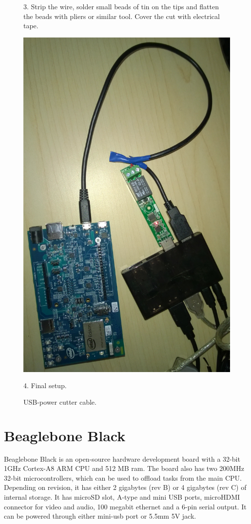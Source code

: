 \documentclass[a4paper,11pt]{article}
\begin{document}
\begin{figure}
\begin{minipage}[c][0.5\textheight][t]{0.49\textwidth}
	3. Strip the wire, solder small beads of tin on the tips and    flatten the beads with pliers or similar tool.
	Cover the cut with electrical tape.
	\end{minipage}
	\begin{minipage}[c][0.5\textheight][t]{0.49\textwidth}
	\centering
	\includegraphics[height=0.35\textheight]{edisonwire4.jpg}
	
	4. Final setup.
	\end{minipage}
	\caption{USB-power cutter cable.}
	\label{fig:usbpower}
\end{figure}

\newpage
\section{Beaglebone Black}
Beaglebone Black is an open-source hardware development board with a 32-bit 1GHz Cortex-A8 ARM CPU and 512 MB ram. The board also has two 200MHz 32-bit microcontrollers, which can be used to offload tasks from the main CPU. Depending on revision, it has either 2 gigabytes (rev B) or 4 gigabytes (rev C) of internal storage. It has microSD slot, A-type and mini USB ports, microHDMI connector for video and audio, 100 megabit ethernet and a 6-pin serial output. It can be powered through either mini-usb port or 5.5mm 5V jack.
\end{document}

